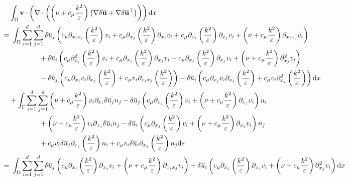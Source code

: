 \documentclass[oneside,11pt]{book}
\numberwithin{equation}{section}
\begin{document}
\begin{align*}
    &\int_\Omega {\bf v}\cdot\left(\nabla\cdot\left(\left(\nu + c_\mu\frac{k^2}{\varepsilon}\right)\left(\nabla\delta\overline{\bf u} + \nabla\delta\overline{\bf u}^\top\right)\right)\right){\rm d}x\\
    =&\ \int_\Omega \sum_{i=1}^d\sum_{j=1}^d \delta\overline{u}_j\left(c_\mu\partial_{x_ix_j}\left(\frac{k^2}{\varepsilon}\right)v_i + c_\mu\partial_{x_j}\left(\frac{k^2}{\varepsilon}\right)\partial_{x_i}v_i + c_\mu\partial_{x_i}\left(\frac{k^2}{\varepsilon}\right)\partial_{x_j}v_i + \left(\nu + c_\mu\frac{k^2}{\varepsilon}\right)\partial_{x_ix_j}v_i\right)\\
    &\hspace{1.5cm} + \delta\overline{u}_i\left(c_\mu\partial_{x_j}^2\left(\frac{k^2}{\varepsilon}\right)v_i + c_\mu\partial_{x_j}\left(\frac{k^2}{\varepsilon}\right)\partial_{x_j}v_i + c_\mu\partial_{x_j}\left(\frac{k^2}{\varepsilon}\right)\partial_{x_j}v_i + \left(\nu + c_\mu\frac{k^2}{\varepsilon}\right)\partial_{x_j}^2v_i\right)\\
    &\hspace{1.5cm} -\delta\overline{u}_j\left(c_\mu\partial_{x_i}v_i\partial_{x_j}\left(\frac{k^2}{\varepsilon}\right) + c_\mu v_i\partial_{x_ix_j}\left(\frac{k^2}{\varepsilon}\right)\right) - \delta\overline{u}_i\left(c_\mu\partial_{x_j}v_i\partial_{x_j}\left(\frac{k^2}{\varepsilon}\right) + c_\mu v_i\partial_{x_j}^2\left(\frac{k^2}{\varepsilon}\right)\right){\rm d}x\\
    &+\int_\Gamma \sum_{i=1}^d\sum_{j=1}^d \left(\nu + c_\mu\frac{k^2}{\varepsilon}\right)v_i\partial_{x_i}\delta\overline{u}_jn_j - \delta\overline{u}_j\left(c_\mu\partial_{x_j}\left(\frac{k^2}{\varepsilon}\right)v_i + \left(\nu + c_\mu\frac{k^2}{\varepsilon}\right)\partial_{x_j}v_i\right)n_i\\
    &\hspace{1.5cm} + \left(\nu + c_\mu\frac{k^2}{\varepsilon}\right)v_i\partial_{x_j}\delta\overline{u}_in_j - \delta\overline{u}_i\left(c_\mu\partial_{x_j}\left(\frac{k^2}{\varepsilon}\right)v_i + \left(\nu + c_\mu\frac{k^2}{\varepsilon}\right)\partial_{x_j}v_i\right)n_j\\
    &\hspace{1.5cm} + c_\mu v_i\delta\overline{u}_j\partial_{x_j}\left(\frac{k^2}{\varepsilon}\right)n_i + c_\mu v_i\delta\overline{u}_i\partial_{x_j}\left(\frac{k^2}{\varepsilon}\right)n_j{\rm d}s\\
    =&\ \int_\Omega \sum_{i=1}^d\sum_{j=1}^d \delta\overline{u}_j\left(c_\mu\partial_{x_i}\left(\frac{k^2}{\varepsilon}\right)\partial_{x_j}v_i + \left(\nu + c_\mu\frac{k^2}{\varepsilon}\right)\partial_{x_ix_j}v_i\right) + \delta\overline{u}_i\left(c_\mu\partial_{x_j}\left(\frac{k^2}{\varepsilon}\right)\partial_{x_j}v_i + \left(\nu + c_\mu\frac{k^2}{\varepsilon}\right)\partial_{x_j}^2v_i\right){\rm d}x\\

\end{align*}
\end{document}
